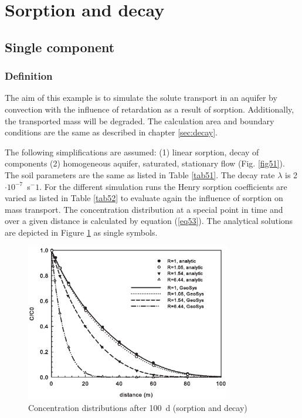 \section{Sorption and decay}

\subsection{Single component}

\subsubsection{Definition}

The aim of this example is to simulate the solute transport in an aquifer by convection with the influence of retardation as a result of sorption. Additionally, the transported mass will be degraded. The calculation area and boundary conditions are the same as described in chapter \ref{sec:decay}.

The following simplifications are assumed: (1) linear sorption, decay of components (2) homogeneous aquifer, saturated, stationary flow (Fig. \ref{fig51}).
%
The soil parameters are the same as listed in Table \ref{tab51}. The decay rate $\lambda$ is 2$\cdot 10^{-7}$~s$^-1$. For the different simulation runs the Henry sorption coefficients are varied as listed in Table \ref{tab52} to evaluate again the influence of sorption on mass transport.
%
The concentration distribution at a special point in time and over a given distance is calculated by equation (\ref{eq53}). The analytical solutions are depicted in Figure \ref{fig58} as single symbols.

\begin{figure}[htbp]
\centering
\includegraphics[width=0.8\textwidth]{PART_II/C/fig58.EPS}
\caption{Concentration distributions after 100~d (sorption and decay)}
\label{fig58}
\end{figure}

